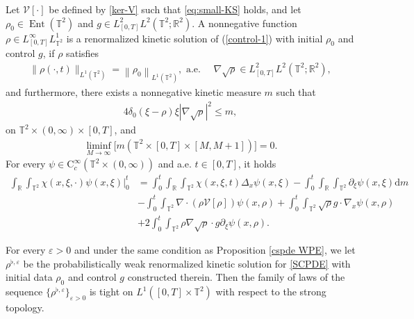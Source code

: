 \begin{defi}\label{ske-kinetic}
Let $\mathcal{V}[\cdot]$ be defined by \eqref{ker-V} such that \eqref{eq:small-KS} holds, and let $\rho_0 \in \operatorname{Ent}\left(\mathbb{T}^2\right)$ and $g\in L^2_{[0,T]}L^2(\mathbb{T}^2;\mathbb{R}^2)$. A  nonnegative function $\rho\in L^\infty_{[0,T]}L^1_{\mathbb{T}^2}$ is  a renormalized kinetic solution of (\ref{control-1}) with initial  $\rho_0$ and control $g$, if $\rho$ satisfies
%
\begin{align}\label{eq:skeleton-l1-fisher}
\|\rho(\cdot,t)\|_{L^{1}\left(\mathbb{T}^2\right)} = \left\|\rho_0\right\|_{L^{1}\left(\mathbb{T}^2\right)}, \text{ a.e. }  \quad \nabla\sqrt{\rho}\in L^2_{[0,T]}L^2(\mathbb{T}^2;\mathbb{R}^2),
\end{align}
%
and furthermore, there exists a nonnegative kinetic measure $m$ such that
%
\begin{align}\label{KM R}
4\delta_{0}(\xi-\rho)\xi|\nabla \sqrt{\rho}|^{2}\le m,
\end{align}
on $\mathbb{T}^2\times(0,\infty)\times[0,T]$, and
\begin{align}\label{KM VI}
\liminf_{M\to \infty}\big[m(\mathbb{T}^2\times [0,T]\times [M,M+1])\big]=0.
\end{align}
%
For every $\psi\in\mathrm{C}_{c}^{\infty}\left(\mathbb{T}^2\times(0,\infty)\right)$ and a.e. $t \in [0,T]$, it holds
%
\begin{align}\label{cspde KSE}
\int_{\mathbb{R}}\int_{\mathbb{T}^2} \chi(x, \xi, \cdot) \psi(x, \xi)\Big|_0^t
 & =\int_{0}^{t} \int_{\mathbb{R}} \int_{\mathbb{T}^2}\chi(x, \xi, t)\Delta_x\psi(x,\xi) - \int_{0}^{t} \int_{\mathbb{R}} \int_{\mathbb{T}^2} \partial_{\xi} \psi(x, \xi) \mathrm{d}m\nonumber\\
&-\int_{0}^{t} \int_{\mathbb{T}^2} \nabla\cdot(\rho \mathcal{V}[\rho])\psi(x, \rho)
+\int_{0}^{t} \int_{\mathbb{T}^2}\sqrt{\rho}g\cdot\nabla_x\psi(x, \rho)\nonumber\\
&+2\int_{0}^{t} \int_{\mathbb{T}^2}\rho\nabla\sqrt{\rho}\cdot g\partial_\xi\psi(x, \rho).
\end{align}
%
\end{defi}



\begin{lem}\label{tight}
For every $\varepsilon>0$ and under the same condition as Proposition \ref{cspde WPE}, we let $\rho^{\flat,\varepsilon}$  be the  probabilistically weak renormalized kinetic solution for \eqref{SCPDE} with initial data $\rho_0$ and control $g$ constructed therein. Then the family of laws of the sequence $\{\rho^{\flat,\varepsilon}\}_{\varepsilon>0}$ is tight on $L^{1}([0, T] \times \mathbb{T}^2)$ with respect to the strong topology.
\end{lem}

